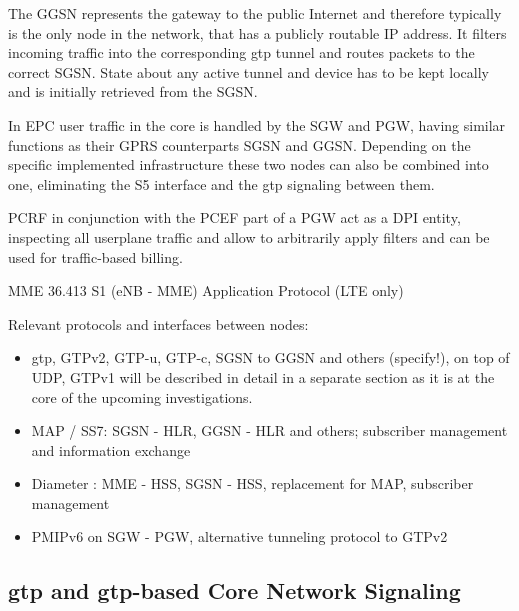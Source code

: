 The \gls{GGSN} represents the gateway to the public Internet and therefore typically is the only node in the network, that has a publicly routable \gls{IP} address. It filters incoming traffic into the corresponding \gls{gtp} tunnel and routes packets to the correct \gls{SGSN}. State about any active tunnel and device has to be kept locally and is initially retrieved from the \gls{SGSN}.

In \gls{EPC} user traffic in the core is handled by the \gls{SGW} and \gls{PGW}, having similar functions as their \gls{GPRS} counterparts \gls{SGSN} and \gls{GGSN}. Depending on the specific implemented infrastructure these two nodes can also be combined into one, eliminating the S5 interface and the \gls{gtp} signaling between them.

\gls{PCRF} in conjunction with the \gls{PCEF} part of a \gls{PGW} act as a \gls{DPI} entity, inspecting all userplane traffic and allow to arbitrarily apply filters and can be used for traffic-based billing. \cite{3gpp.23.203}

\gls{MME} 36.413 \cite{3gpp.36.413} S1 (\gls{eNB} - \gls{MME}) Application Protocol (LTE only)
	

	


Relevant protocols and interfaces between nodes:
\begin{itemize}
	\item \gls{gtp}, GTPv2, GTP-u, GTP-c, \gls{SGSN} to \gls{GGSN} and others (specify!), on top of \gls{UDP}, GTPv1 will be described in detail in a separate section as it is at the core of the upcoming investigations.
	\item \gls{MAP} / \gls{SS7}: \gls{SGSN} - \gls{HLR}, \gls{GGSN} - \gls{HLR} and others; subscriber management and information exchange
	\item Diameter \cite{rfc6733}: \gls{MME} - \gls{HSS}, \gls{SGSN} - \gls{HSS}, replacement for \gls{MAP}, subscriber management

	\item PMIPv6 on \gls{SGW} - \gls{PGW}, alternative tunneling protocol to GTPv2
\end{itemize}




\subsection{\texorpdfstring{\acrshort{gtp}}{GTP} and \texorpdfstring{\acrshort{gtp}}{GTP}-based Core Network Signaling}
\label{c4:sec:gtp}


